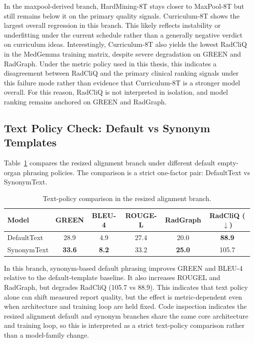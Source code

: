 In the maxpool-derived branch, HardMining-8T stays closer to MaxPool-8T but still remains below it on the primary quality signals. Curriculum-8T shows the largest overall regression in this branch. This likely reflects instability or underfitting under the current schedule rather than a generally negative verdict on curriculum ideas.
Interestingly, Curriculum-8T also yields the lowest \ac{RadCliQ} in the MedGemma training matrix, despite severe degradation on \ac{GREEN} and \ac{RadGraph}. Under the metric policy used in this thesis, this indicates a disagreement between \ac{RadCliQ} and the primary clinical ranking signals under this failure mode rather than evidence that Curriculum-8T is a stronger model overall. For this reason, \ac{RadCliQ} is not interpreted in isolation, and model ranking remains anchored on \ac{GREEN} and \ac{RadGraph}.

\subsection{Text Policy Check: Default vs Synonym Templates}
Table~\ref{tab:text_policy_synonyms} compares the resized alignment branch under different default empty-organ phrasing policies. The comparison is a strict one-factor pair: DefaultText vs SynonymText.

\begin{table}[htbp]
    \centering
    \caption{Text-policy comparison in the resized alignment branch.}
    \label{tab:text_policy_synonyms}
    \begin{tabular}{lccccc}
        \toprule
        \textbf{Model} & \textbf{GREEN} & \textbf{BLEU-4} & \textbf{ROUGE-L} & \textbf{RadGraph} & \textbf{RadCliQ ($\downarrow$)} \\\midrule
        DefaultText & 28.9 & 4.9 & 27.4 & 20.0 & \textbf{88.9} \\
        SynonymText & \textbf{33.6} & \textbf{8.2} & 33.2 & \textbf{25.0} & 105.7 \\
        \bottomrule
    \end{tabular}
\end{table}

In this branch, synonym-based default phrasing improves \ac{GREEN} and BLEU-4 relative to the default-template baseline. It also increases \ac{ROUGEL} and \ac{RadGraph}, but degrades \ac{RadCliQ} (105.7 vs 88.9). This indicates that text policy alone can shift measured report quality, but the effect is metric-dependent even when architecture and training loop are held fixed.
Code inspection indicates the resized alignment default and synonym branches share the same core architecture and training loop, so this is interpreted as a strict text-policy comparison rather than a model-family change.


